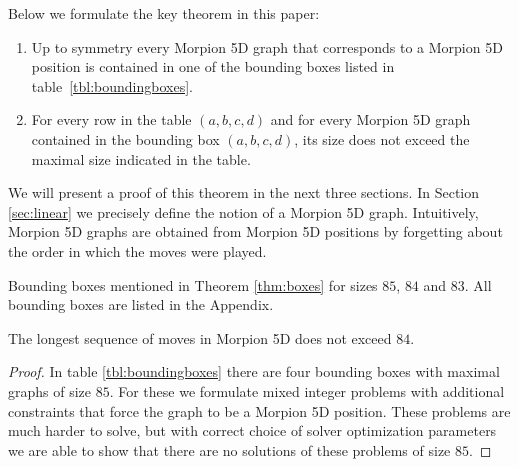   
Below we formulate the key theorem in this paper: %
\begin{theorem}
\begin{enumerate}
\item Up to symmetry every Morpion 5D graph that corresponds to a Morpion 5D position
    is contained in one of the bounding boxes listed in table~\ref{tbl:boundingboxes}.
\item For every row in the table $(a,b,c,d)$ and for every Morpion 5D graph contained in the bounding box  $(a,b,c,d)$,
its size does not exceed the maximal size indicated in the table.
\end{enumerate} 
\label{thm:boxes}
\end{theorem}
We will present a proof of this theorem in the next three sections. 
In Section \ref{sec:linear} we precisely define the notion of a Morpion 5D graph. Intuitively, Morpion 5D graphs are obtained from Morpion 5D positions by forgetting about the order in which the moves were played.

\begin{table}[ht]
\centering
 

\caption{Bounding boxes mentioned in Theorem \ref{thm:boxes} for sizes $85$, $84$ and $83$. All bounding boxes are listed in the Appendix. }
\label{tbl:boundingboxes}
\end{table}




\begin{corollary}
\label{cor:84}
The longest sequence of moves in Morpion 5D does not exceed $84$.
\end{corollary}
\begin{proof} 
In table \ref{tbl:boundingboxes} there are four bounding boxes with maximal graphs of size $85$. 
For these we formulate mixed integer problems with additional constraints that force the graph to
  be a Morpion 5D position.
These problems are much harder to solve, but with correct choice of solver optimization parameters we are able to show
  that there are no solutions of these problems of size $85$.
\end{proof}



